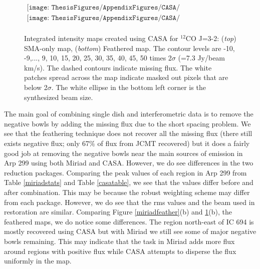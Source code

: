  \begin{figure}[h]
\centering
$\begin{array}{c}
\texttt{[image: ThesisFigures/AppendixFigures/CASA/CASASMAco32.pdf]} \\
\texttt{[image: ThesisFigures/AppendixFigures/CASA/CASAfeatherco32.pdf]} \\
\end{array}$
\caption[ntegrated intensity maps created using CASA for $^{12}$CO J=3-2]{Integrated intensity maps created using CASA for $^{12}$CO J=3-2: (\textit{top}) SMA-only map, (\textit{bottom}) Feathered map. The contour levels are -10, -9,..., 9, 10, 15, 20, 25, 30, 35, 40, 45, 50 times 2$\sigma$ (=7.3 Jy/beam km/s). The dashed contours indicate missing flux. The white patches spread across the map indicate masked out pixels that are below 2$\sigma$. The white ellipse in the bottom left corner is the synthesized beam size.}
\label{casafeather}
\end{figure}
 
The main goal of combining single dish and interferometric data is to remove the negative bowls by adding the missing flux due to the short spacing problem. We see that the feathering technique does not recover all the missing flux (there still exists negative flux; only 67$\%$ of flux from JCMT recovered) but it does a fairly good job at removing the negative bowls near the main sources of emission in Arp 299 using both Miriad and CASA.  However, we do see differences in the two reduction packages. Comparing the peak values of each region in Arp 299 from Table \ref{miriadstats} and Table \ref{casatable}, we see that the values differ before and after combination. This may be because the robust weighting scheme may differ from each package. However, we do see that the rms values and the beam used in restoration are similar. Comparing Figure \ref{miriadfeather}(b) and \ref{casafeather}(b), the feathered maps, we do notice some differences. The region north-east of IC 694 is mostly recovered using CASA but with Miriad we still see some of major negative bowls remaining. This may indicate that the task in Miriad adds more flux around regions with positive flux while CASA attempts to disperse the flux uniformly in the map. 
